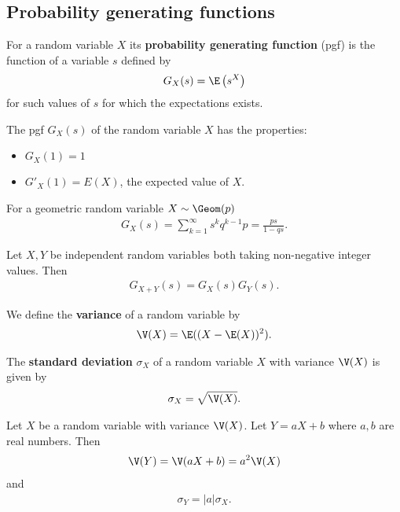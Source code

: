 \documentclass{article}
\begin{document}
\subsection{Probability generating functions}
\begin{definition}
    For a random variable $X$ its \textbf{probability generating function} (pgf) is the function of a variable
    $s$ defined by
    \begin{align*}
        G_X(s) = \E\left(s^X\right)
    \end{align*}
    for such values of $s$ for which the expectations exists.
\end{definition}
\begin{theorem}
    The pgf $G_X(s)$ of the random variable $X$ has the properties:
    \begin{itemize}
        \item $G_X(1) = 1$
        \item $G'_X(1)=E(X)$, the expected value of $X$.
    \end{itemize}
\end{theorem}
\begin{lemma}
    For a geometric random variable $X\sim \Geom(p)$
    \begin{align*}
        G_X(s) = \sum_{k=1}^\infty s^k q^{k-1}p
        = \frac{ps}{1-qs}.
    \end{align*}
\end{lemma}
\begin{theorem}
    Let $X,Y$ be independent random variables both taking
    non-negative integer values. Then
    \begin{align*}
        G_{X+Y}(s) = G_X(s)G_Y(s).
    \end{align*}
\end{theorem}
\begin{definition}
    We define the \textbf{variance} of a random variable by
    \begin{align*}
        \V(X) = \E((X-\E(X))^2).
    \end{align*}
\end{definition}
\begin{definition}
    The \textbf{standard deviation} $\sigma_X$ of a random
    variable $X$ with variance $\V(X)$ is given by
    \begin{align*}
        \sigma_X = \sqrt{\V(X)}.
    \end{align*}
\end{definition}
\begin{theorem}
    Let $X$ be a random variable with variance $\V(X)$.
    Let $Y= a X + b$ where $a,b$ are real numbers.
    Then
    \begin{align*}
        \V(Y) = \V(aX+b) = a^2\V(X)
    \end{align*}
    and
    \begin{align*}
        \sigma_Y = |a|\sigma_X.
    \end{align*}
\end{theorem}
\end{document}
